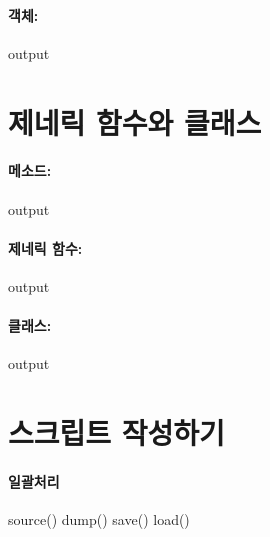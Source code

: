 \documentclass{report}
\begin{document}
\paragraph{객체:}

\begin{Schunk}
\begin{Soutput}
output
\end{Soutput}
\end{Schunk}

\section{제네릭 함수와 클래스}
\paragraph{메소드:}
\begin{Schunk}
\begin{Soutput}
output
\end{Soutput}
\end{Schunk}

\paragraph{제네릭 함수:}
\begin{Schunk}
\begin{Soutput}
output
\end{Soutput}
\end{Schunk}

\paragraph{클래스:}
\begin{Schunk}
\begin{Soutput}
output
\end{Soutput}
\end{Schunk}

\section{스크립트 작성하기}
\paragraph{일괄처리}
\begin{Schunk}
\begin{Soutput}
source()
dump()
save()
load()

\end{Soutput}
\end{Schunk}
\end{document}
